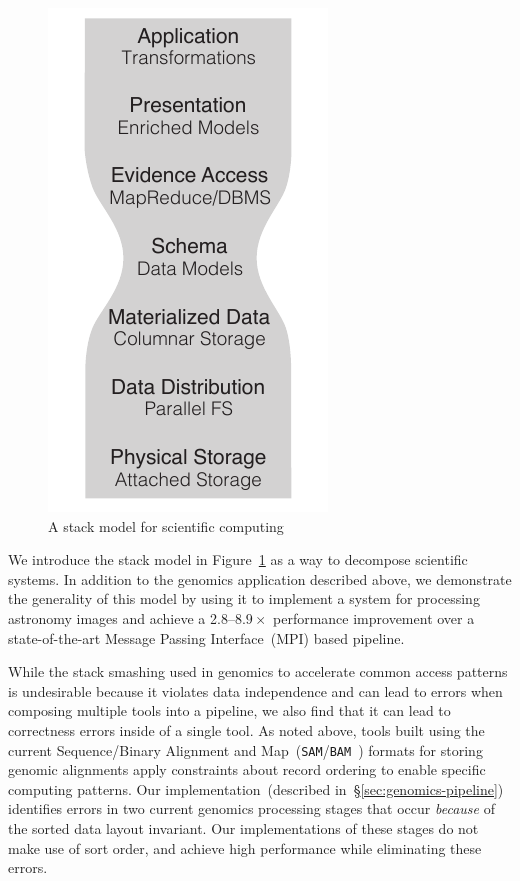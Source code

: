 \documentclass{sig-alternate}
\begin{document}
\begin{figure}[h]
\begin{center}
\includegraphics{stack-model-2.pdf}
\end{center}
\caption{A stack model for scientific computing}
\label{fig:stack-model}
\end{figure}

We introduce the stack model in Figure~\ref{fig:stack-model} as a way to decompose scientific systems. In
addition to the genomics application described above, we demonstrate the generality of this model by using it to
implement a system for processing astronomy images and achieve a 2.8--$8.9\times$ performance
improvement over a state-of-the-art Message Passing Interface~(MPI) based pipeline.

While the stack smashing used in genomics to accelerate common access patterns is undesirable because it
violates data independence and can lead to errors when composing multiple tools into a pipeline, we also find
that it can lead to correctness errors inside of a single tool. As noted
above, tools built using the current Sequence/Binary Alignment and Map~(\texttt{SAM}/\texttt{BAM}~\cite{li09}) formats
for storing genomic alignments apply constraints about record ordering to enable specific computing patterns. Our
implementation~(described in~\S\ref{sec:genomics-pipeline}) identifies errors in two current genomics
processing stages that occur \emph{because} of the sorted data layout invariant. Our implementations of
these stages do not make use of sort order, and achieve high performance while eliminating these errors.
\end{document}
